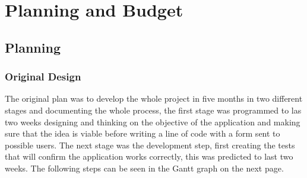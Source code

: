\chapter{Planning and Budget}\label{chap:8}
\section{Planning}\label{sec:chap5_plan}
\subsection{Original Design}\label{sec:chap5_plan_ori}
The original plan was to develop the whole project in five months in two different stages and documenting the whole process, the first stage was programmed to las two weeks designing and thinking on the objective of the application and making sure that the idea is viable before writing a line of code with a form sent to possible users. The next stage was the development step, first creating the tests that will confirm the application works correctly, this was predicted to last two weeks. The following steps can be seen in the Gantt graph on the next page.\\

